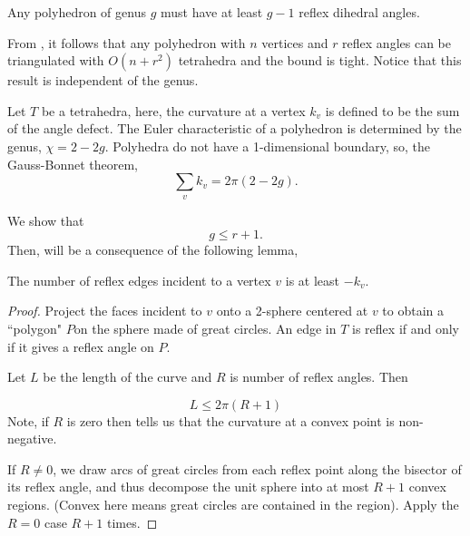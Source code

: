 \begin{theorem}\label{thm:reflex}

Any polyhedron of genus $g$ must have 
at least $g-1$ reflex dihedral angles. 

\end{theorem}

From , it follows that any polyhedron
with $n$ vertices and $r$ reflex angles
can be triangulated with $O(n+r^2)$ tetrahedra 
and the bound is tight. Notice that this result is independent
of the genus.

Let $T$ be a tetrahedra, here, the curvature at a vertex $k_v$ is defined to
be the sum of the angle defect.
The Euler characteristic of a polyhedron is determined by the genus,
$\chi=2-2g$.
Polyhedra do not have a 1-dimensional boundary, 
so, the Gauss-Bonnet theorem,
$$\sum_vk_v=2\pi (2-2g).$$

We show that
$$g\leq r+1.$$ 
Then,  will be a consequence of the following
lemma,

\begin{lemma}\label{lem:reflex-edge}
The number of reflex edges  incident to a vertex $v$  is at least $-k_v.$
\end{lemma}

\begin{proof}

Project the faces incident to $v$ onto a 2-sphere centered at $v$
to obtain a ``polygon" $P$on the sphere made  of great circles.
An edge in $T$ is reflex if and only if it gives  a reflex angle on $P$.

Let $L$ be the length of the curve and $R$ is  number of reflex  angles.
Then

\begin{equation} \label{eqn:length-reflex}
L\leq 2\pi (R+1)
\end{equation}
Note, if $R$ is zero then 
tells us that the curvature at a convex point is non-negative.

If $R\neq 0$, we draw arcs of great circles from each reflex point
along the bisector of its reflex angle, and thus decompose the unit sphere
into at most $R+1$ convex regions. (Convex here means
great circles are contained in the region).
Apply the $R=0$ case $R+1$ times.

\end{proof}

